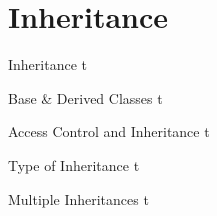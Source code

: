 \documentclass[../lecture5-objectorientation.tex]{subfiles}
\begin{document}
\section{Inheritance}


\begin{frame}[fragile]{Inheritance}
t
\end{frame}


\begin{frame}[fragile]{Base \& Derived Classes}
t
\end{frame}


\begin{frame}[fragile]{Access Control and Inheritance}
t
\end{frame}


\begin{frame}[fragile]{Type of Inheritance}
t
\end{frame}


\begin{frame}[fragile]{Multiple Inheritances}
t
\end{frame}

\end{document}
